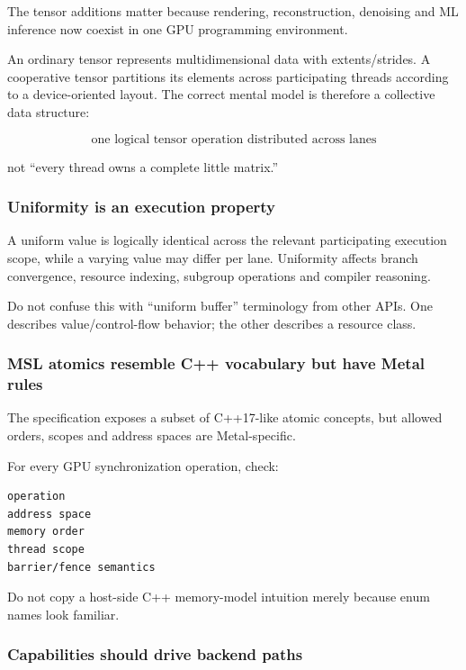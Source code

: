 The tensor additions matter because rendering, reconstruction, denoising and ML inference now coexist in one GPU programming environment.

An ordinary tensor represents multidimensional data with extents/strides. A cooperative tensor partitions its elements across participating threads according to a device-oriented layout. The correct mental model is therefore a collective data structure:

\[
\boxed{
\text{one logical tensor operation distributed across lanes}
}
\]

not ``every thread owns a complete little matrix.''

\subsubsection{Uniformity is an execution property}\label{05-engine-i-ch022-uniformity-is-an-execution-property}

A uniform value is logically identical across the relevant participating execution scope, while a varying value may differ per lane. Uniformity affects branch convergence, resource indexing, subgroup operations and compiler reasoning.

Do not confuse this with ``uniform buffer'' terminology from other APIs. One describes value/control-flow behavior; the other describes a resource class.

\subsubsection{MSL atomics resemble C++ vocabulary but have Metal rules}\label{05-engine-i-ch022-msl-atomics-resemble-c-vocabulary-but-have-metal-rules}

The specification exposes a subset of C++17-like atomic concepts, but allowed orders, scopes and address spaces are Metal-specific.

For every GPU synchronization operation, check:

\begin{verbatim}
operation
address space
memory order
thread scope
barrier/fence semantics
\end{verbatim}

Do not copy a host-side C++ memory-model intuition merely because enum names look familiar.

\subsubsection{Capabilities should drive backend paths}\label{05-engine-i-ch022-capabilities-should-drive-backend-paths}

